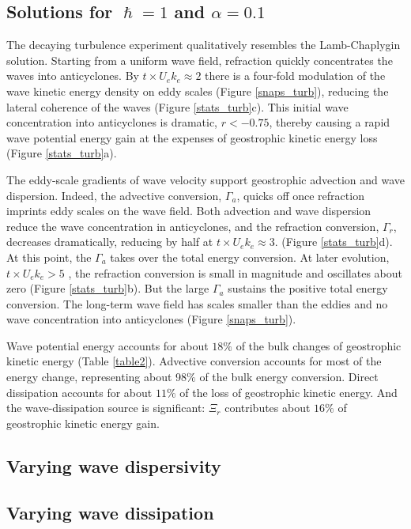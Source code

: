 \documentclass{jfm}
\begin{document}
\subsection{Solutions for $\hslash = 1$ and $\alpha = 0.1$}

The decaying turbulence experiment qualitatively resembles the Lamb-Chaplygin solution.
Starting from a uniform wave field, refraction quickly concentrates the waves into
anticyclones. By
$t\times U_e k_e \approx 2$ there is a four-fold modulation of the wave kinetic
energy density on eddy scales (Figure \ref{snaps_turb}), reducing the lateral
coherence of the waves (Figure \ref{stats_turb}c). This initial wave concentration
into anticyclones is dramatic, $r < -0.75$, thereby causing a rapid wave potential
energy gain at the expenses of geostrophic kinetic energy loss
(Figure \ref{stats_turb}a).

The eddy-scale gradients of wave velocity support geostrophic advection and
wave dispersion. Indeed, the advective conversion, $\Gamma_a$, quicks off once
refraction imprints eddy scales on the wave field. Both advection and wave dispersion
reduce the wave concentration in anticyclones, and the refraction conversion,
$\Gamma_r$, decreases dramatically, reducing by half  at $t\times U_e k_e \approx 3$.
(Figure \ref{stats_turb}d). At this point, the $\Gamma_a$ takes over the total energy conversion. At later
evolution, $t\times U_e k_e > 5$ , the refraction conversion is small
in magnitude and oscillates about zero (Figure \ref{stats_turb}b).
But the large $\Gamma_a$ sustains the positive total energy conversion. The long-term
wave field has scales smaller than the eddies and no wave concentration into anticyclones
(Figure \ref{snaps_turb}).

Wave potential energy accounts for about $18\%$ of the bulk changes of geostrophic
kinetic energy (Table \ref{table2}). Advective conversion accounts for most of the
energy change, representing about 98$\%$ of the bulk energy conversion. Direct
dissipation accounts for about $11\%$ of the loss of geostrophic kinetic energy.
And the wave-dissipation source is significant: $\Xi_r$ contributes about $16\%$
of geostrophic kinetic energy gain.


\subsection{Varying wave dispersivity}


\subsection{Varying wave dissipation}
\end{document}
